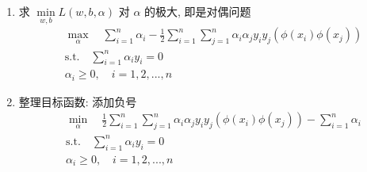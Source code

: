\documentclass[oneside, 12pt]{ctexbook}
\begin{document}
\begin{enumerate}
\begin{enumerate}
\begin{enumerate}[(1)]
									\item 求 $\min\limits_{w,b} L(w,b,\alpha)$ 对 $\alpha$ 的极大, 即是对偶问题
										\begin{align}
											&\max\limits_{\alpha} \quad \sum_{i=1}^{n} \alpha_i - \frac{1}{2} \sum_{i=1}^{n}\sum_{j=1}^{n} \alpha_i \alpha_j y_i y_j \left( \phi(x_i) \phi(x_j) \right)\\
											&\text{s.t.} \quad \sum_{i=1}^{n} \alpha_i y_i =0\\
											&\alpha_i \geq 0, \quad i=1,2,...,n
										\end{align}
										
									\item 整理目标函数: 添加负号
										\begin{align}
											&\min\limits_{\alpha} \quad \frac{1}{2} \sum_{i=1}^{n}\sum_{j=1}^{n} \alpha_i \alpha_j y_i y_j \left( \phi(x_i) \phi(x_j) \right) - \sum_{i=1}^{n} \alpha_i \\
											&\text{s.t.} \quad \sum_{i=1}^{n} \alpha_i y_i =0\\
											&\alpha_i \geq 0, \quad i=1,2,...,n
										\end{align}
								\end{enumerate}
						\end{enumerate}						
				\end{enumerate}
			
\end{document}
